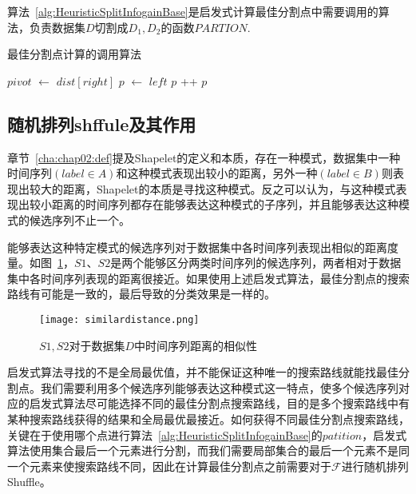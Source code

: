 算法~\ref{alg:HeuristicSplitInfogainBase}是启发式计算最佳分割点中需要调用的算法，负责数据集$D$切割成$D_1,D_2$的函数$PARTION$.%
\begin{algorithm}
	\caption{最佳分割点计算的调用算法}
	\label{alg:HeuristicSplitInfogainBase}
	\begin{algorithmic}[1]
			\State $pivot$ $\gets$ $dist[right]$
			\State $p$ $\gets$ $left$
					\State {}
					\State {}
					\State $p$ ++
				\EndIf
			\EndFor
			\State {}
			\State \Return $p$
		\EndFunction
	\end{algorithmic}
\end{algorithm}

\subsection{随机排列shffule及其作用}
\label{cha:chap04:myalg:infogain:shuffle}

章节~\ref{cha:chap02:def}提及Shapelet的定义和本质，存在一种模式，数据集中一种时间序列$(label \in A)$和这种模式表现出较小的距离，另外一种$(label \in B)$则表现出较大的距离，Shapelet的本质是寻找这种模式。反之可以认为，与这种模式表现出较小距离的时间序列都存在能够表达这种模式的子序列，并且能够表达这种模式的候选序列不止一个。

能够表达这种特定模式的候选序列对于数据集中各时间序列表现出相似的距离度量。如图~\ref{fig:similardistance}，$S1$、$S2$是两个能够区分两类时间序列的候选序列，两者相对于数据集中各时间序列表现的距离很接近。如果使用上述启发式算法，最佳分割点的搜索路线有可能是一致的，最后导致的分类效果是一样的。

\begin{figure}[H] %
	\centering
	\texttt{[image: similardistance.png]}
	\caption{$S1,S2$对于数据集$D$中时间序列距离的相似性}
	\label{fig:similardistance}
\end{figure}

启发式算法寻找的不是全局最优值，并不能保证这种唯一的搜索路线就能找最佳分割点。我们需要利用多个候选序列能够表达这种模式这一特点，使多个候选序列对应的启发式算法尽可能选择不同的最佳分割点搜索路线，目的是多个搜索路线中有某种搜索路线获得的结果和全局最优最接近。如何获得不同最佳分割点搜索路线，关键在于使用哪个点进行算法~\ref{alg:HeuristicSplitInfogainBase}的$patition$，启发式算法使用集合最后一个元素进行分割，而我们需要局部集合的最后一个元素不是同一个元素来使搜索路线不同，因此在计算最佳分割点之前需要对于$\mathcal{F}$进行随机排列Shuffle。

